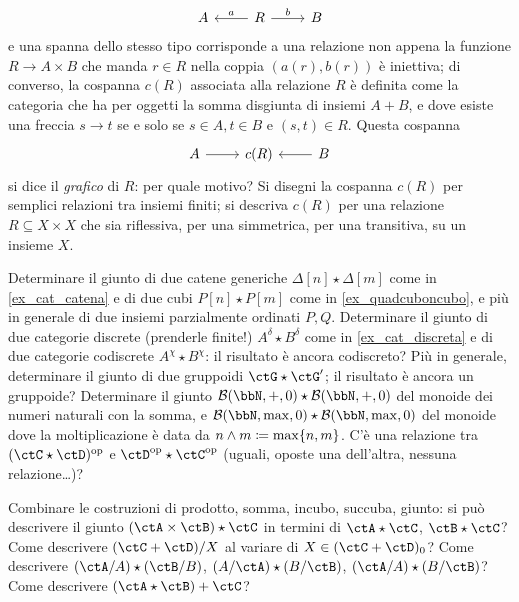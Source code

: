 \begin{esercizi}
	\[
		\begin{tikzcd}
			A & R \ar[r, "b"]\ar[l, "a"']& B
		\end{tikzcd}
	\]
	e una spanna dello stesso tipo corrisponde a una relazione non appena la funzione \(R \to A\times B\) che manda \(r\in R\) nella coppia \((a(r),b(r))\) è iniettiva; di converso, la cospanna \(c(R)\) associata alla relazione \(R\) è definita come la categoria che ha per oggetti la somma disgiunta di insiemi \(A+B\), e dove esiste una freccia \(s\to t\) se e solo se \(s\in A,t\in B\) e \((s,t)\in R\). Questa cospanna
	\[
		\begin{tikzcd}
			A \ar[r] & c(R) & \ar[l] B
		\end{tikzcd}
	\]
	si dice il \emph{grafico} di \(R\): per quale motivo? Si disegni la cospanna \(c(R)\) per semplici relazioni tra insiemi finiti; si descriva \(c(R)\) per una relazione \(R\subseteq X\times X\) che sia riflessiva, per una simmetrica, per una transitiva, su un insieme \(X\).
	\item Determinare il giunto di due catene generiche \(\Delta[n] \star \Delta[m]\) come in \ref{ex_cat_catena} e di due cubi \(P[n] \star P[m]\) come in \ref{ex_quadcuboncubo}, e più in generale di due insiemi parzialmente ordinati \(P,Q\). Determinare il giunto di due categorie discrete (prenderle finite!) \(A^\delta \star B^\delta\) come in \ref{ex_cat_discreta} e di due categorie codiscrete \(A^\chi \star B^\chi\): il risultato è ancora codiscreto? Più in generale, determinare il giunto di due gruppoidi \(\ctG \star \ctG'\); il risultato è ancora un gruppoide? Determinare il giunto \(\susp(\bbN,+,0) \star \susp(\bbN,+,0)\) del monoide dei numeri naturali con la somma, e \(\susp(\bbN,\max,0) \star \susp(\bbN,\max,0)\) del monoide dove la moltiplicazione è data da \(n\land m \coloneqq \max\{n,m\}\). C'è una relazione tra \((\ctC\star\ctD)^\op\) e \(\ctD^\op\star\ctC^\op\) (uguali, oposte una dell'altra, nessuna relazione\dots)?
	\item Combinare le costruzioni di prodotto, somma, incubo, succuba, giunto: si può descrivere il giunto \((\ctA\times\ctB)\star\ctC\) in termini di \(\ctA\star\ctC\), \(\ctB\star\ctC\)? Come descrivere \((\ctC+\ctD)/X\) al variare di \(X\in(\ctC+\ctD)_0\)? Come descrivere \((\ctA/A)\star(\ctB/B)\), \((A/\ctA)\star(B/\ctB)\), \((\ctA/A)\star(B/\ctB)\)? Come descrivere \((\ctA\star\ctB)+\ctC\)?
\end{esercizi}
